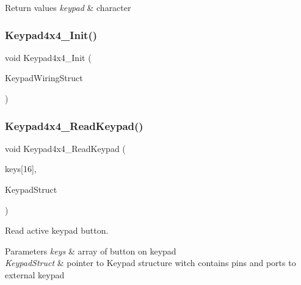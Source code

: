 \begin{DoxyRetVals}{Return values}
{\em keypad} & character \\
\hline
\end{DoxyRetVals}
\mbox{\label{group___key_pad___functions_gaac942a10ebab5bbc3df7e6a5d3dac8d8}} 
\subsubsection{\texorpdfstring{Keypad4x4\+\_\+\+Init()}{Keypad4x4\_Init()}}
{\footnotesize\ttfamily void Keypad4x4\+\_\+\+Init (\begin{DoxyParamCaption}\item[{\hyperlink{struct_keypad___wires_type_def}{Keypad\+\_\+\+Wires\+Type\+Def} $\ast$}]{Keypad\+Wiring\+Struct }\end{DoxyParamCaption})}

\mbox{\label{group___key_pad___functions_ga1cd1795849837cdb6eab0531b0fe9996}} 
\subsubsection{\texorpdfstring{Keypad4x4\+\_\+\+Read\+Keypad()}{Keypad4x4\_ReadKeypad()}}
{\footnotesize\ttfamily void Keypad4x4\+\_\+\+Read\+Keypad (\begin{DoxyParamCaption}\item[{bool}]{keys\mbox{[}16\mbox{]},  }\item[{\hyperlink{struct_keypad___wires_type_def}{Keypad\+\_\+\+Wires\+Type\+Def} $\ast$}]{Keypad\+Struct }\end{DoxyParamCaption})}



Read active keypad button. 


\begin{DoxyParams}{Parameters}
{\em keys} & array of button on keypad \\
\hline
{\em Keypad\+Struct} & pointer to Keypad structure witch contains pins and ports to external keypad \\
\hline
\end{DoxyParams}

